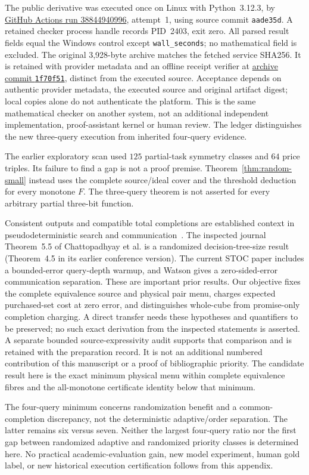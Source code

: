 \documentclass[pdflatex,sn-mathphys-num]{sn-jnl}
\theoremstyle{thmstyleone}
\theoremstyle{thmstylethree}
\theoremstyle{thmstyletwo}
\begin{document}
The public derivative was executed once on Linux with Python~3.12.3, by \href{https://github.com/SHiJiE1115/newproj/actions/runs/38844940996}{GitHub Actions run 38844940996}, attempt~1, using source commit \texttt{aade35d}. A retained checker process handle records PID~2403, exit zero. All parsed result fields equal the Windows control except \texttt{wall\_seconds}; no mathematical field is excluded. The original 3,928-byte archive matches the fetched service SHA256. It is retained with provider metadata and an offline receipt verifier at \href{https://github.com/SHiJiE1115/newproj/tree/1f70f518aa56f6ed368ce8d02fab5cbeb5ee3dc9/evidence/small_menu_hosted_v01}{archive commit \texttt{1f70f51}}, distinct from the executed source. Acceptance depends on authentic provider metadata, the executed source and original artifact digest; local copies alone do not authenticate the platform. This is the same mathematical checker on another system, not an additional independent implementation, proof-assistant kernel or human review. The ledger distinguishes the new three-query execution from inherited four-query evidence.

The earlier exploratory scan used $125$ partial-task symmetry classes and $64$ price triples. Its failure to find a gap is not a proof premise. Theorem~\ref{thm:random-small} instead uses the complete source/ideal cover and the threshold deduction for every monotone $F$. The three-query theorem is not asserted for every arbitrary partial three-bit function.

Consistent outputs and compatible total completions are established context in pseudodeterministic search and communication~\cite{chattopadhyay2025pseudo,goos2026pseudo,watson2026pseudo}. The inspected journal Theorem~5.5 of Chattopadhyay et al. is a randomized decision-tree-size result (Theorem~4.5 in its earlier conference version). The current STOC paper includes a bounded-error query-depth warmup, and Watson gives a zero-sided-error communication separation. These are important prior results. Our objective fixes the complete equivalence source and physical pair menu, charges expected purchased-set cost at zero error, and distinguishes whole-cube from promise-only completion charging. A direct transfer needs these hypotheses and quantifiers to be preserved; no such exact derivation from the inspected statements is asserted. A separate bounded source-expressivity audit supports that comparison and is retained with the preparation record. It is not an additional numbered contribution of this manuscript or a proof of bibliographic priority. The candidate result here is the exact minimum physical menu within complete equivalence fibres and the all-monotone certificate identity below that minimum.

The four-query minimum concerns randomization benefit and a common-completion discrepancy, not the deterministic adaptive/order separation. The latter remains six versus seven. Neither the largest four-query ratio nor the first gap between randomized adaptive and randomized priority classes is determined here. No practical academic-evaluation gain, new model experiment, human gold label, or new historical execution certification follows from this appendix.
\end{document}
